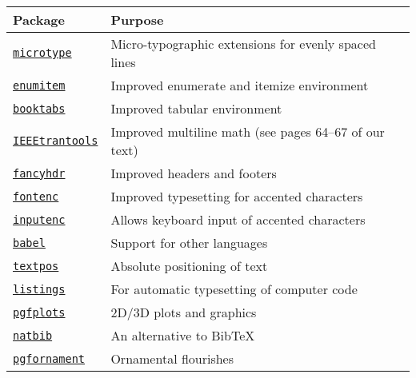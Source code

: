\documentclass{paper}
\begin{document}
\begin{center}
\begin{tabular}{l l}
\toprule 

Package & Purpose \\

\midrule

\href{https://www.ctan.org/pkg/microtype}{\texttt{microtype}} &
Micro-typographic extensions for evenly spaced lines \\

\href{https://www.ctan.org/pkg/enumitem}{\texttt{enumitem}} &
Improved enumerate and itemize environment \\

\href{https://www.ctan.org/pkg/booktabs}{\texttt{booktabs}} & 
Improved tabular environment \\

\href{https://www.ctan.org/tex-archive/macros/latex/contrib/IEEEtran/}{\texttt{IEEEtrantools}} & 
Improved multiline math (see pages 64--67 of our text) \\

\href{https://www.ctan.org/pkg/fancyhdr}{\texttt{fancyhdr}} &
Improved headers and footers \\

\href{https://www.ctan.org/pkg/fontenc}{\texttt{fontenc}} & 
Improved typesetting for accented characters \\

\href{https://www.ctan.org/pkg/fontenc}{\texttt{inputenc}} & 
Allows keyboard input of accented characters \\

\href{https://www.ctan.org/pkg/babel}{\texttt{babel}} & 
Support for other languages \\

\href{https://www.ctan.org/pkg/textpos}{\texttt{textpos}} & 
Absolute positioning of text \\

\href{https://www.ctan.org/pkg/listings}{\texttt{listings}} & 
For automatic typesetting of computer code \\

\href{https://www.ctan.org/pkg/pgfplots}{\texttt{pgfplots}} &
2D/3D plots and graphics \\

\href{https://www.ctan.org/pkg/natbib}{\texttt{natbib}} & 
An alternative to BibTeX \\

\href{https://www.ctan.org/pkg/pgfornament}{\texttt{pgfornament}} &
Ornamental flourishes \\
\bottomrule
\end{tabular}
\end{center}
\end{document}
